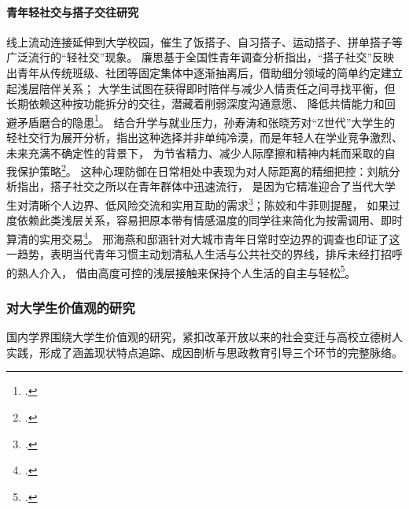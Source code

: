 \paragraph{青年轻社交与搭子交往研究}
线上流动连接延伸到大学校园，催生了饭搭子、自习搭子、运动搭子、拼单搭子等广泛流行的“轻社交”现象。
廉思基于全国性青年调查分析指出，“搭子社交”反映出青年从传统班级、社团等固定集体中逐渐抽离后，借助细分领域的简单约定建立起浅层陪伴关系；
大学生试图在获得即时陪伴与减少人情责任之间寻找平衡，但长期依赖这种按功能拆分的交往，潜藏着削弱深度沟通意愿、
降低共情能力和回避矛盾磨合的隐患\footcite{Lian2024a}。
结合升学与就业压力，孙寿涛和张晓芳对“Z世代”大学生的轻社交行为展开分析，指出这种选择并非单纯冷漠，而是年轻人在学业竞争激烈、未来充满不确定性的背景下，
为节省精力、减少人际摩擦和精神内耗而采取的自我保护策略\footcite{Sun2023}。
这种心理防御在日常相处中表现为对人际距离的精细把控：刘航分析指出，搭子社交之所以在青年群体中迅速流行，
是因为它精准迎合了当代大学生对清晰个人边界、低风险交流和实用互助的需求\footcite{LiuHang2023}；陈姣和牛菲则提醒，
如果过度依赖此类浅层关系，容易把原本带有情感温度的同学往来简化为按需调用、即时算清的实用交易\footcite{ChenJiao2024}。
邢海燕和邸涵针对大城市青年日常时空边界的调查也印证了这一趋势，表明当代青年习惯主动划清私人生活与公共社交的界线，排斥未经打招呼的熟人介入，
借由高度可控的浅层接触来保持个人生活的自主与轻松\footcite{Xing2022}。

\subsubsection{对大学生价值观的研究}

国内学界围绕大学生价值观的研究，紧扣改革开放以来的社会变迁与高校立德树人实践，形成了涵盖现状特点追踪、成因剖析与思政教育引导三个环节的完整脉络。

